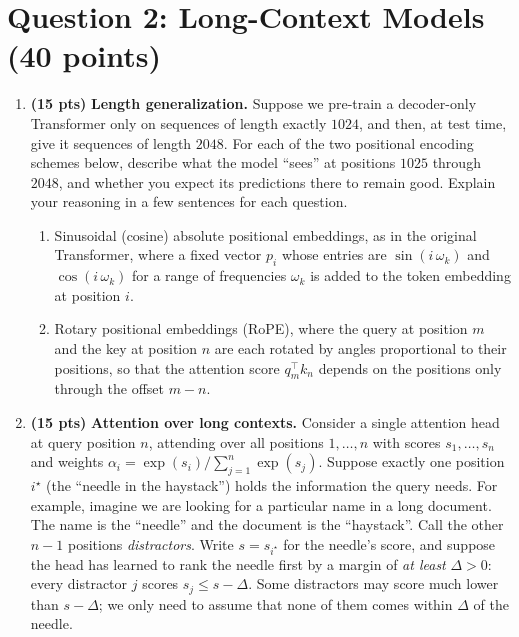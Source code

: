 \documentclass[11pt]{article}
\begin{document}
\section{Question 2: Long-Context Models (40 points)}

\begin{enumerate}[label=(\alph*)]

  \item \textbf{(15 pts)} \textbf{Length generalization.} Suppose we pre-train a decoder-only Transformer only on
  sequences of length exactly $1024$, and then, at test time, give it sequences of length $2048$. For each of the
  two positional encoding schemes below, describe what the model ``sees'' at positions $1025$ through $2048$, and whether you expect its predictions there to remain good. 
  Explain your reasoning
  in a few sentences for each question.
  \begin{enumerate}[label=(\roman*)]
    \item Sinusoidal (cosine) absolute positional embeddings, as in the original Transformer, where a fixed vector
    $p_i$ whose entries are $\sin(i\,\omega_k)$ and $\cos(i\,\omega_k)$ for a range of frequencies $\omega_k$ is
    added to the token embedding at position $i$.
    \item Rotary positional embeddings (RoPE), where the query at position $m$ and the key at position $n$ are
    each rotated by angles proportional to their positions, so that the attention score $q_m^\top k_n$ depends on
    the positions only through the offset $m - n$.
  \end{enumerate}

  \item \textbf{(15 pts)} \textbf{Attention over long contexts.} Consider a single attention head at query position
  $n$, attending over all positions $1, \dots, n$ with scores $s_1, \dots, s_n$ and weights
  $\alpha_i = \exp(s_i) / \sum_{j=1}^{n} \exp(s_j)$. Suppose exactly one position $i^\star$ (the ``needle in the haystack'') holds the
  information the query needs. For example, imagine we are looking for a particular name in a long document. The name is the ``needle'' and the document is the ``haystack''.  
  Call the other $n-1$ positions \emph{distractors}. 
  Write $s = s_{i^\star}$ for the needle's score, and suppose the head has learned to rank the needle first by a
  margin of \emph{at least} $\Delta > 0$: every distractor $j$ scores $s_j \le s - \Delta$. Some distractors may score
  much lower than $s - \Delta$; we only need to assume that none of them comes within $\Delta$ of the needle.


\end{enumerate}
\end{document}
